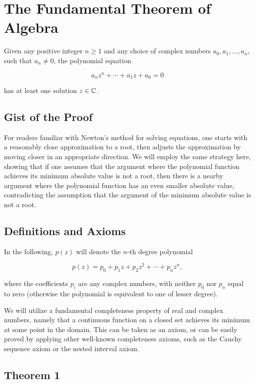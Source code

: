 \newpage
\section{The Fundamental Theorem of Algebra}

Given any positive integer \(n \geq 1\) and any choice of complex numbers \(a_0, a_1, \ldots, a_n\), 
such that \(a_n \neq 0\), the polynomial equation

\[
	a_n z^n + \cdots + a_1 z + a_0 = 0 
\]

has at least one solution \(z \in \mathbb{C}\).

\subsection{Gist of the Proof}

For readers familiar with Newton’s method for solving equations, one starts with a reasonably close 
approximation to a root, then adjusts the approximation by moving closer in an appropriate direction. 
We will employ the same strategy here, showing that if one assumes that the argument where the polynomial 
function achieves its minimum absolute value is not a root, then there is a nearby argument where the 
polynomial function has an even smaller absolute value, contradicting the assumption that the argument of 
the minimum absolute value is not a root.

\subsection{Definitions and Axioms}

In the following, \(p(z)\) will denote the \(n\)-th degree polynomial

\[
	p(z) = p_0 + p_1 z + p_2 z^2 + \cdots + p_n z^n,
\]

where the coefficients \(p_i\) are any complex numbers, with neither \(p_0\) nor \(p_n\) equal to zero 
(otherwise the polynomial is equivalent to one of lesser degree).

We will utilize a fundamental completeness property of real and complex numbers, namely that a continuous 
function on a closed set achieves its minimum at some point in the domain. This can be taken as an axiom, 
or can be easily proved by applying other well-known completeness axioms, such as the Cauchy sequence 
axiom or the nested interval axiom.

\subsection{Theorem 1}

